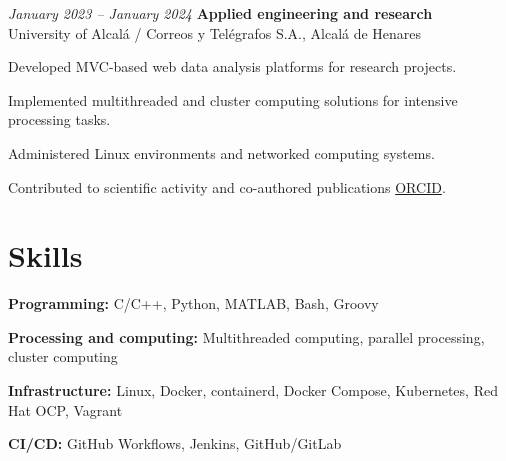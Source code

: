 \vspace{0.2 cm}

\begin{twocolentry}{\textit{January 2023 – January 2024}}
	\textbf{Applied engineering and research} \\
	University of Alcalá / Correos y Telégrafos S.A., Alcalá de Henares
\end{twocolentry}
\begin{onecolentry}
	\begin{highlights}
		\item Developed MVC-based web data analysis platforms for research projects.
		\item Implemented multithreaded and cluster computing solutions for intensive processing tasks.
		\item Administered Linux environments and networked computing systems.
		\item Contributed to scientific activity and co-authored publications \href{https://orcid.org/0009-0000-6862-1872}{ORCID}.
	\end{highlights}
\end{onecolentry}

\vspace{-7pt}

\section{Skills}

\begin{onecolentry}
	\textbf{Programming:} C/C++, Python, MATLAB, Bash, Groovy
\end{onecolentry}
\begin{onecolentry}
	\textbf{Processing and computing:} Multithreaded computing, parallel processing, cluster computing
\end{onecolentry}
\begin{onecolentry}
	\textbf{Infrastructure:} Linux, Docker, containerd, Docker Compose, Kubernetes, Red Hat OCP, Vagrant
\end{onecolentry}
\begin{onecolentry}
	\textbf{CI/CD:} GitHub Workflows, Jenkins, GitHub/GitLab
\end{onecolentry}